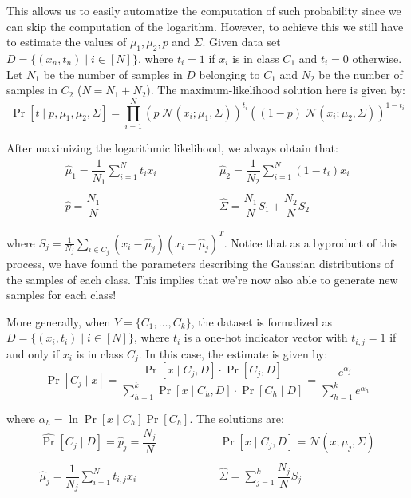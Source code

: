\documentclass[a4paper, 12pt]{report}
\begin{document}
    This allows us to easily automatize the computation of such probability since we can skip the computation of the logarithm. However, to achieve this we still have to estimate the values of $\mu_1, \mu_2, p$ and $\Sigma$. Given data set $D = \{(x_n,t_n) \mid i \in [N]\}$, where $t_i = 1$ if $x_i$ is in class $C_1$ and $t_i = 0$ otherwise. Let $N_1$ be the number of samples in $D$ belonging to $C_1$ and $N_2$ be the number of samples in $C_2$ ($N = N_1+N_2$). The maximum-likelihood solution here is given by:
    \[\Pr[t \mid p, \mu_1, \mu_2, \Sigma] = \prod_{i = 1}^N (p \; \mathcal{N}(x_i; \mu_1, \Sigma))^{t_i} ((1-p) \; \mathcal{N}(x_i; \mu_2, \Sigma))^{1-t_i}\]

    After maximizing the logarithmic likelihood, we always obtain that:
    \[\begin{array}{ccc}
        \widehat \mu_1 = \dfrac{1}{N_1} \sum\limits_{i = 1}^N t_i x_i &\qquad\qquad& \widehat \mu_2 = \dfrac{1}{N_2} \sum\limits_{i = 1}^N (1-t_i) x_i \\\\
        \widehat p = \dfrac{N_1}{N} &\qquad\qquad& \widehat \Sigma = \dfrac{N_1}{N} S_1 + \dfrac{N_2}{N} S_2
    \end{array}\]

    where $S_j = \frac{1}{N_j} \sum_{i \in C_j} (x_i - \widehat \mu_j)(x_i - \widehat \mu_j)^T$. Notice that as a byproduct of this process, we have found the parameters describing the Gaussian distributions of the samples of each class. This implies that we're now also able to generate new samples for each class!

    More generally, when $Y = \{C_1, \ldots, C_k\}$, the dataset is formalized as $D = \{(x_i, t_i) \mid i \in [N]\}$, where $t_i$ is a one-hot indicator vector with $t_{i,j} = 1$ if and only if $x_i$ is in class $C_j$. In this case, the estimate is given by:
    \[\Pr[C_j \mid x] = \frac{\Pr[x \mid C_j,D] \cdot \Pr[C_j,D]}{\sum_{h = 1}^k \Pr[x \mid C_h,D] \cdot \Pr[C_h \mid D]} = \frac{e^{\alpha_j}}{\sum_{h = 1}^k e^{\alpha_h}}\]

    where $\alpha_h = \ln \Pr[x \mid C_h] \Pr[C_h]$. The solutions are:
    \[\begin{array}{ccc}
        \widehat \Pr[C_j \mid D] = \widehat p_j = \dfrac{N_j}{N} &\qquad\qquad& \Pr[x \mid C_j,D] = \mathcal{N}(x; \mu_j, \Sigma)\\\\
        \widehat \mu_j = \dfrac{1}{N_j} \sum\limits_{i = 1}^N t_{i,j} x_i &\qquad\qquad& \widehat \Sigma = \sum\limits_{j = 1}^k \dfrac{N_j}{N} S_j
    \end{array}\]
\end{document}
